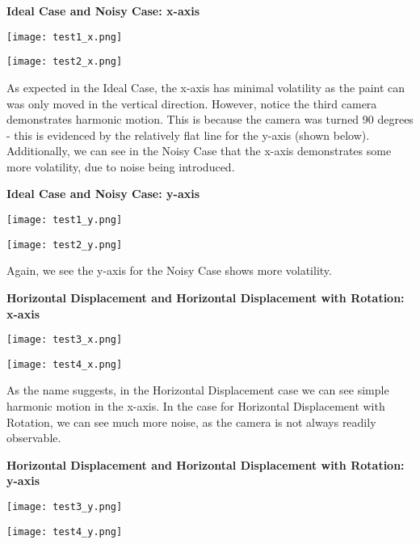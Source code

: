 \documentclass{cup-pan}
\begin{document}
\vskip 0.05in
\noindent
\textbf{Ideal Case and Noisy Case: x-axis}
\begin{center}
\texttt{[image: test1\_x.png]}
\end{center}
\begin{center}
\texttt{[image: test2\_x.png]}
\end{center}

\noindent
As expected in the Ideal Case, the x-axis has minimal volatility as the paint can was only moved in the vertical direction.  However, notice the third camera demonstrates harmonic motion.  This is because the camera was turned 90 degrees - this is evidenced by the relatively flat line for the y-axis (shown below). Additionally, we can see in the Noisy Case that the x-axis demonstrates some more volatility, due to noise being introduced.  

\vskip 0.05in
\noindent
\textbf{Ideal Case and Noisy Case: y-axis}
\begin{center}
\texttt{[image: test1\_y.png]}
\end{center}
\begin{center}
\texttt{[image: test2\_y.png]}
\end{center}

\noindent
Again, we see the y-axis for the Noisy Case shows more volatility. 

\vskip 0.05in
\noindent
\textbf{Horizontal Displacement and Horizontal Displacement with Rotation: x-axis}

\begin{center}
\texttt{[image: test3\_x.png]}
\end{center}
\begin{center}
\texttt{[image: test4\_x.png]}
\end{center}

\noindent
As the name suggests, in the Horizontal Displacement case  we can see simple harmonic motion in the x-axis. In the case for Horizontal Displacement with Rotation, we can see much more noise, as the camera is not always readily observable.  

\vskip 0.05in
\noindent
\textbf{Horizontal Displacement and Horizontal Displacement with Rotation: y-axis}

\begin{center}
\texttt{[image: test3\_y.png]}
\end{center}
\begin{center}
\texttt{[image: test4\_y.png]}
\end{center}
\end{document}
